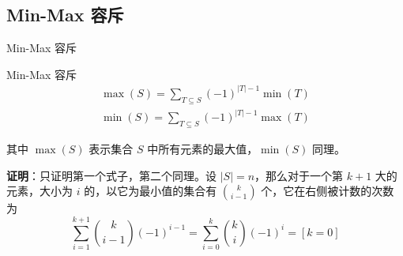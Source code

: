 \documentclass[UTF8]{beamer}
\begin{document}
        

    
    \subsection{Min-Max 容斥}
    \begin{frame}{Min-Max 容斥}
        \begin{block}{Min-Max 容斥}
            \vspace{-2em}
            \begin{gather*}
                \max(S) = \sum_{T\subseteq S}(-1)^{|T|-1}\min(T)\\
                \min(S) = \sum_{T\subseteq S}(-1)^{|T|-1}\max(T)
            \end{gather*}

            \vspace{-0.5em}
            其中 $\max (S)$ 表示集合 $S$ 中所有元素的最大值，$\min (S)$ 同理。
        \end{block}
        \pause
        \textbf{证明}：只证明第一个式子，第二个同理。设 $|S|=n$，那么对于一个第 $k+1$ 大的元素，大小为 $i$ 的，以它为最小值的集合有 $\binom{k}{i-1}$ 个，它在右侧被计数的次数为
        $$
        \sum_{i=1}^{k+1}\binom{k}{i-1}(-1)^{i-1} =\sum_{i=0}^k\binom{k}i (-1)^i = [k=0] 
        $$
    \end{frame}
\end{document}
